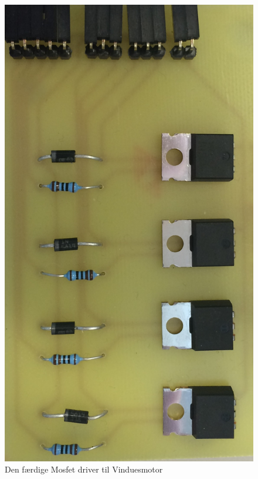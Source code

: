 \begin{figure}[h]
\centering 
\includegraphics[width={\textwidth-5cm}, trim=0 0 0 0, clip=true] {../fig/MotorPrintBillede} 
\caption{Den færdige Mosfet driver til Vinduesmotor}
\label{fig:vinduesmotor_print}
\end{figure}

\clearpage